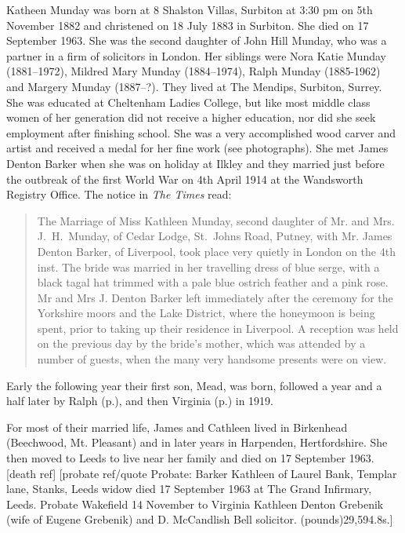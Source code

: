 
Katheen Munday was born at 8 Shalston Villas, Surbiton at 3:30 pm on 5th November 1882\cite{JHMtree, KMbirthCert, JHMbible} and christened on 18 July 1883 in Surbiton. She died on 17 September 1963. She was the second daughter of John Hill Munday, who was a partner in a firm of solicitors in London. Her siblings were Nora Katie Munday (1881--1972), Mildred Mary Munday (1884--1974), Ralph Munday (1885-1962) and Margery Munday (1887--?). They lived at The Mendips, Surbiton, Surrey.  She was educated at Cheltenham Ladies College, but like most middle class women of her generation did not receive a higher education, nor did she seek employment after finishing school. She was a very accomplished wood carver and artist and received a medal for her fine work (see photographs). She met James Denton Barker when she was on holiday at Ilkley and they married just before the outbreak of the first World War on 4th April 1914 at the Wandsworth Registry Office.\cite{KathleenJamesWeddingIndex} The notice in \emph{The Times} read:

\begin{quotation}
The Marriage of Miss Kathleen Munday, second daughter of Mr. and Mrs. J.\ H.\ Munday, of Cedar Lodge, St.\ Johns Road, Putney, with Mr. James Denton Barker, of Liverpool, took place very quietly in London on the 4th inst. The bride was married in her travelling dress of blue serge, with a black tagal hat trimmed with a pale blue ostrich feather and a pink rose. Mr and Mrs J. Denton Barker left immediately after the ceremony for the Yorkshire moors and the Lake District, where the honeymoon is being spent, prior to taking up their residence in Liverpool. A reception was held on the previous day by the bride's mother, which was attended by a number of guests, when the many very handsome presents were on view.
\end{quotation}

Early the following year their first son, Mead, was born, followed a year and a half later by Ralph (p.\pageref{Ralph_Munday_Denton-Barker}), and then Virginia (p.\pageref{Virginia_Kathleen_Denton_Barker}) in 1919.

For most of their married life, James and Cathleen lived in Birkenhead (Beechwood, Mt. Pleasant) and in later years in Harpenden, Hertfordshire. She then moved to Leeds to live near her family and died on 17 September 1963. [death ref] [probate ref/quote  Probate: Barker Kathleen of Laurel Bank, Templar lane, Stanks, Leeds widow died 17 September 1963 at The Grand Infirmary, Leeds. Probate Wakefield 14 November to Virginia Kathleen Denton Grebenik (wife of Eugene Grebenik) and D. McCandlish Bell solicitor. (pounds)29,594.8s.]
